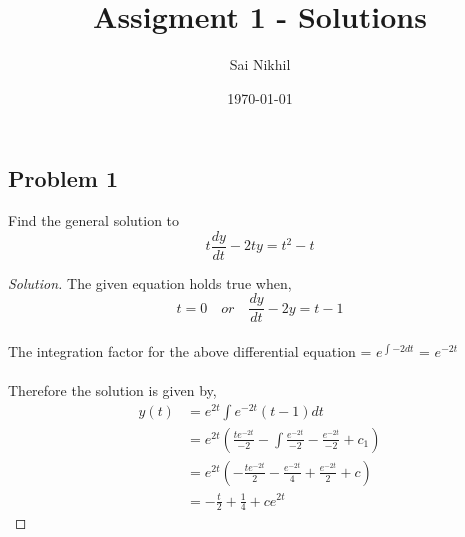 \documentclass{article}
\title{Assigment 1 - Solutions}
\author{Sai Nikhil}
\date\today
\newenvironment{solution}
{\renewcommand\qedsymbol{$\blacksquare$}\begin{proof}[Solution]}{\end{proof}}
\begin{document}
\maketitle

\subsection*{Problem 1}
Find the general solution to \[ t \frac{dy}{dt} - 2ty = t^2 - t \]
\begin{solution}
	The given equation holds true when,
\[ t = 0 \quad or \quad \frac{dy}{dt} - 2y = t - 1 \] \\
The integration factor for the above differential equation = $ e^{\int -2dt} $ = $ e^{-2t} $ \\ \\
Therefore the solution is given by,
\begin{equation}
\begin{split}
y(t) & = e^{2t}\int{e^{-2t}(t - 1)dt}\\
& = e^{2t} \left(\frac{te^{-2t}}{-2} - \int{\frac{e^{-2t}}{-2}} - \frac{e^{-2t}}{-2} + c_1\right) \\
& = e^{2t} \left(-\frac{te^{-2t}}{2} - \frac{e^{-2t}}{4} + \frac{e^{-2t}}{2} + c\right) \\
& = -\frac{t}{2} + \frac{1}{4} + ce^{2t}
\end{split}
\end{equation}


\end{solution}
\end{document}
